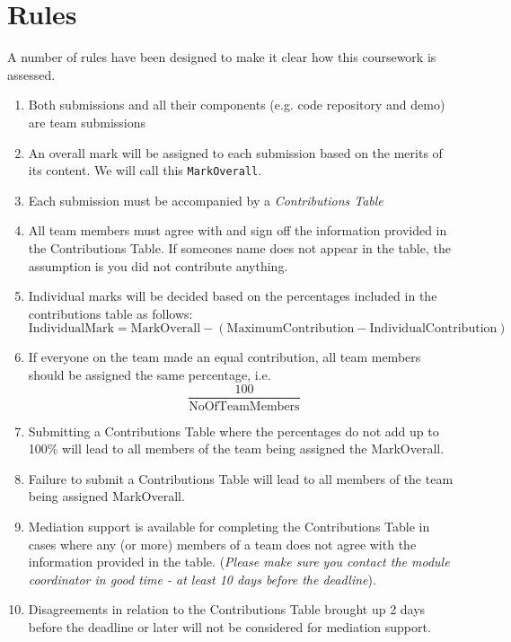 \section{Rules}
A number of rules have been designed to make it clear how this coursework is assessed.
\begin{enumerate}
    \item Both submissions and all their components (e.g. code repository and demo) are team submissions
    \item An overall mark will be assigned to each submission based on the merits of its content. We will call this \verb|MarkOverall|.
    \item Each submission must be accompanied by a \textit{Contributions Table}
    \item All team members must agree with and sign off the information provided in the Contributions Table. If someones name does not appear in the table, the assumption is you did not contribute anything.
    \item Individual marks will be decided based on the percentages included in the contributions table as follows:
        \[ \mathrm{IndividualMark} = \mathrm{MarkOverall} - ( \mathrm{MaximumContribution} - \mathrm{IndividualContribution}) \]
    \item If everyone on the team made an equal contribution, all team members should be assigned the same percentage, i.e. 
        \[\frac{100}{\mathrm{NoOfTeamMembers}}\]
    \item Submitting a Contributions Table where the percentages do not add up to 100\% will lead to all members of the team being assigned the MarkOverall.
    \item Failure to submit a Contributions Table will lead to all members of the team being assigned MarkOverall.
    \item Mediation support is available for completing the Contributions Table in cases where any (or more) members of a team does not agree with the information provided in the table. (\textit{Please make sure you contact the module coordinator in good time - at least 10 days before the deadline}).
    \item Disagreements in relation to the Contributions Table brought up 2 days before the deadline or later will not be considered for mediation support.
\end{enumerate}
